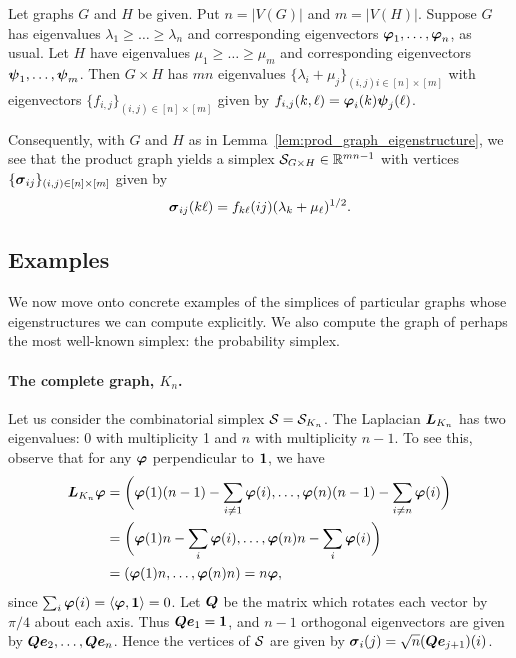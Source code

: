 \begin{lemma}
	\label{lem:prod_graph_eigenstructure}
	Let graphs $G$  and $H$ be given. Put $n=|V(G)|$ and $m=|V(H)|$. Suppose $G$ has eigenvalues $\lambda_1\geq \dots\geq \lambda_{n}$ and corresponding eigenvectors $\vb*{\varphi}_1,\dots,\vb*{\varphi}_{n}$, as usual. Let $H$ have eigenvalues $\mu_1\geq \dots\geq \mu_{m}$ and corresponding eigenvectors $\vb*{\psi}_1,\dots,\vb*{\psi}_{m}$. Then $G\times H$ has $mn$ eigenvalues $\{\lambda_i+\mu_j\}_{(i,j)i\in[n]\times[m]}$ with eigenvectors $\{f_{i,j}\}_{(i,j)\in[n]\times[m]}$ given by 
	$f_{i,j}(k,\ell) = \vb*{\varphi}_i(k)\vb*{\psi}_j(\ell)$. 
\end{lemma}

Consequently, with $G$ and $H$ as in Lemma~\ref{lem:prod_graph_eigenstructure}, we see that the product graph yields a simplex $\mathcal{S}_{G\times H}\in\mathbb{R}^{mn-1}$ with vertices $\{\vb*{\sigma}_{ij}\}_{(i,j)\in[n]\times[m]}$ given by 
\[\vb*{\sigma}_{ij}(k\ell)=f_{k\ell}(ij)(\lambda_k+\mu_\ell)^{1/2}.\]


\subsection{Examples}
\label{sec:examples}

We now move onto concrete examples of the simplices of particular graphs whose eigenstructures we can compute explicitly. We also compute the graph of perhaps the most well-known simplex:  the probability simplex. 

\paragraph{The complete graph, $K_n$.}
Let us consider the combinatorial simplex $\mathcal{S}=\mathcal{S}_{K_n}$.  The Laplacian $\vb*{L}_{K_n}$ has two eigenvalues: 0 with multiplicity 1 and $n$ with multiplicity $n-1$. To see this, observe that for any $\vb*{\varphi}$ perpendicular to $\vb{1}$, we have 
\begin{align*}
\vb*{L}_{K_n}\vb*{\varphi} &= \bigg(\vb*{\varphi}(1)(n-1)-\sum_{i\neq 1}\vb*{\varphi}(i),\dots,\vb*{\varphi}(n)(n-1)-\sum_{i\neq n}\vb*{\varphi}(i)\bigg) \\
&= \bigg(\vb*{\varphi}(1)n - \sum_i \vb*{\varphi}(i), \dots,\vb*{\varphi}(n)n - \sum_i \vb*{\varphi}(i)\bigg) \\
&= (\vb*{\varphi}(1)n,\dots,\vb*{\varphi}(n)n) = n\vb*{\varphi},
\end{align*}
since $\sum_i\vb*{\varphi}(i)=\langle \vb*{\varphi},\vb{1}\rangle =0$. Let $\vb*{Q}$  be the matrix which rotates each vector  by $\pi/4$  about each axis. Thus $\vb*{Q}\vb*{e}_1=\vb{1}$, and $n-1$ orthogonal eigenvectors are given by $\vb*{Q}\vb*{e}_2,\dots,\vb*{Q}\vb*{e}_n$. Hence the vertices of $\mathcal{S}$  are given by $\vb*{\sigma}_i(j) = \sqrt{n}(\vb*{Q}\vb*{e}_{j+1})(i)$. 

